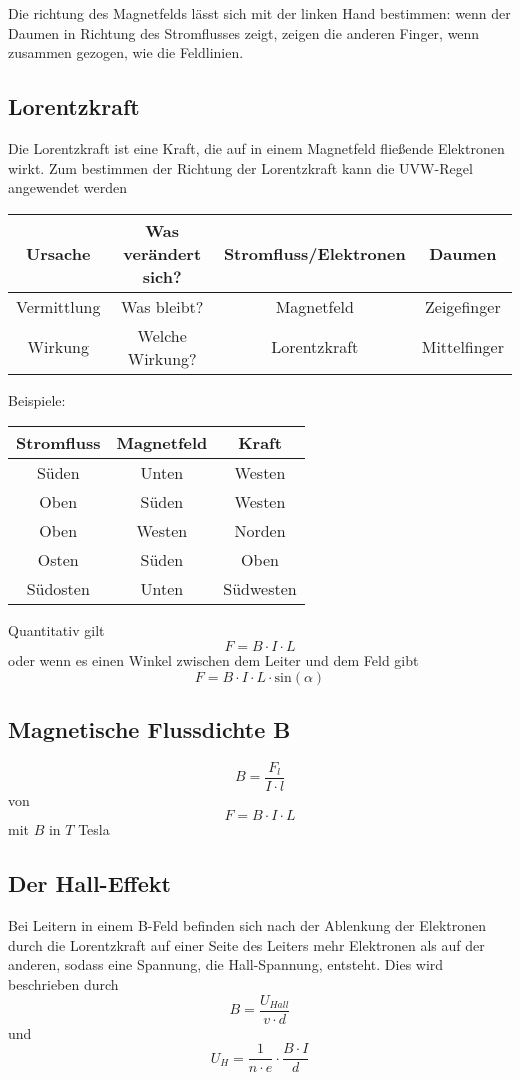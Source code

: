 \documentclass{article}
\begin{document}
Die richtung des Magnetfelds lässt sich mit der linken Hand bestimmen: wenn der Daumen in Richtung des Stromflusses zeigt, zeigen die anderen Finger, wenn zusammen gezogen, wie die Feldlinien. 
 
\subsection{Lorentzkraft}
Die Lorentzkraft ist eine Kraft, die auf in einem Magnetfeld fließende Elektronen wirkt. Zum bestimmen der Richtung der Lorentzkraft kann die UVW-Regel angewendet werden
\begin{center}
\begin{tabular}{ |c|c|c|c| }
\hline
 Ursache & Was verändert sich? & Stromfluss/Elektronen & Daumen \\
\hline
 Vermittlung & Was bleibt? & Magnetfeld & Zeigefinger \\
\hline
 Wirkung & Welche Wirkung? & Lorentzkraft & Mittelfinger \\
\hline
\end{tabular}
\end{center}
Beispiele:
\begin{center}
\begin{tabular}{ |c|c|c| }
\hline
 Stromfluss & Magnetfeld & Kraft \\
\hline
 Süden & Unten & Westen \\
 Oben & Süden & Westen \\
 Oben & Westen & Norden \\
 Osten & Süden & Oben \\
 Südosten & Unten & Südwesten \\
\hline
\end{tabular}
\end{center}
 
Quantitativ gilt
\[F=B \cdot I \cdot L\]
oder wenn es einen Winkel zwischen dem Leiter und dem Feld gibt
\[F=B \cdot I \cdot L \cdot \text{sin}(\alpha)\]
 
\subsection{Magnetische Flussdichte B} 
\[B=\frac{F_l}{I \cdot l}\]
von 
\[F=B \cdot I \cdot L\]
mit $B$ in $T$ Tesla 
 
\subsection{Der Hall-Effekt} 
Bei Leitern in einem B-Feld befinden sich nach der Ablenkung der Elektronen durch die Lorentzkraft auf einer Seite des Leiters mehr Elektronen als auf der anderen, sodass eine Spannung, die Hall-Spannung, entsteht. Dies wird beschrieben durch
\[B=\frac{U_{Hall}}{v \cdot d}\] 
und
\[U_H=\frac{1}{n \cdot e} \cdot \frac{B \cdot I}{d}\] 
 
\end{document}
